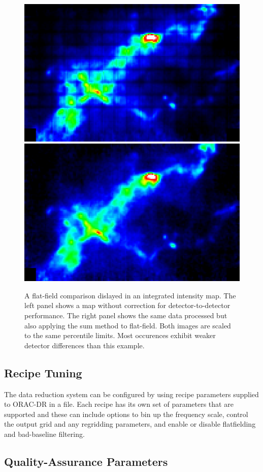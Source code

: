 \documentclass[final,authoryear,5p,times,twocolumn]{elsarticle}
\begin{document}
\begin{figure}
\includegraphics[width=0.495\columnwidth]{12CO_L1455_noflat.png}
\includegraphics[width=0.495\columnwidth]{12CO_L1455_flat.png}
\caption{A flat-field comparison dislayed in an integrated intensity
  map.  The left panel shows a map without correction for
  detector-to-detector performance.  The right panel shows the same
  data processed but also applying the sum method to flat-field.  Both
  images are scaled to the same percentile limits.  Most occurences
  exhibit weaker detector differences than this example.}
\label{fig:flatfield:results}
\end{figure}


\subsection{Recipe Tuning}

The data reduction system can be configured by using recipe parameters
supplied to ORAC-DR in a file. Each recipe has its own set of
parameters that are supported and these can include options to bin up
the frequency scale, control the output grid and any regridding
parameters, and enable or disable flatfielding and bad-baseline filtering.

\subsection{Quality-Assurance Parameters \label{sec:qa}}
\end{document}
